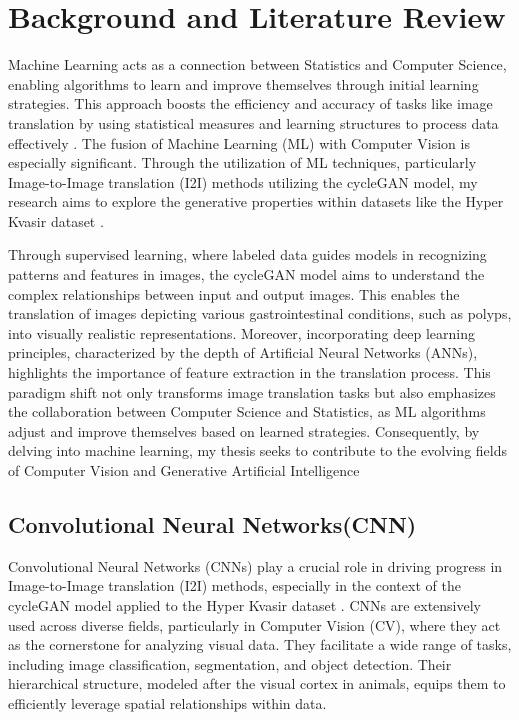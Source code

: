 \documentclass[UKenglish,12pt]{master-style}
\begin{document}
\chapter{Background and Literature Review}

Machine Learning acts as a connection between Statistics and Computer Science, enabling algorithms to learn and improve themselves through initial learning strategies. This approach boosts the efficiency and accuracy of tasks like image translation by using statistical measures and learning structures to process data effectively \cite{app14020496}. The fusion of Machine Learning (ML) with Computer Vision is especially significant. Through the utilization of ML techniques, particularly Image-to-Image translation (I2I) methods utilizing the cycleGAN model, my research aims to explore the generative properties within datasets like the Hyper Kvasir dataset  \cite{I2I}.

Through supervised learning, where labeled data guides models in recognizing patterns and features in images, the cycleGAN model aims to understand the complex relationships between input and output images. This enables the translation of images depicting various gastrointestinal conditions, such as polyps, into visually realistic representations. Moreover, incorporating deep learning principles, characterized by the depth of Artificial Neural Networks (ANNs), highlights the importance of feature extraction in the translation process. This paradigm shift not only transforms image translation tasks but also emphasizes the collaboration between Computer Science and Statistics, as ML algorithms adjust and improve themselves based on learned strategies. Consequently, by delving into machine learning, my thesis seeks to contribute to the evolving fields of Computer Vision and Generative Artificial Intelligence

\section{Convolutional Neural Networks(CNN)}

\vspace{-12pt}Convolutional Neural Networks (CNNs) play a crucial role in driving progress in Image-to-Image translation (I2I) methods, especially in the context of the cycleGAN model applied to the Hyper Kvasir dataset \cite{CNN} . CNNs are extensively used across diverse fields, particularly in Computer Vision (CV), where they act as the cornerstone for analyzing visual data. They facilitate a wide range of tasks, including image classification, segmentation, and object detection. Their hierarchical structure, modeled after the visual cortex in animals, equips them to efficiently leverage spatial relationships within data.
\end{document}
